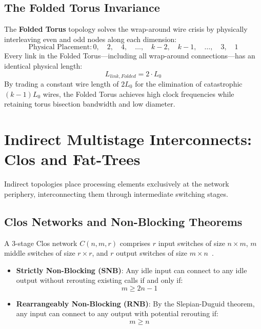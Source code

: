 \subsection{The Folded Torus Invariance}
The \textbf{Folded Torus} topology solves the wrap-around wire crisis by physically interleaving even and odd nodes along each dimension:
\begin{equation}
\text{Physical Placement}: 0, \quad 2, \quad 4, \quad \dots, \quad k-2, \quad k-1, \quad \dots, \quad 3, \quad 1
\label{eq:ch4_folded_order}
\end{equation}
Every link in the Folded Torus—including all wrap-around connections—has an identical physical length:
\begin{equation}
L_{link, Folded} = 2 \cdot L_0
\label{eq:ch4_folded_len}
\end{equation}
By trading a constant wire length of $2 L_0$ for the elimination of catastrophic $(k-1) L_0$ wires, the Folded Torus achieves high clock frequencies while retaining torus bisection bandwidth and low diameter.

\section{Indirect Multistage Interconnects: Clos and Fat-Trees}
\label{sec:ch4_indirect}

Indirect topologies place processing elements exclusively at the network periphery, interconnecting them through intermediate switching stages.

\subsection{Clos Networks and Non-Blocking Theorems}
A 3-stage Clos network $C(n, m, r)$ comprises $r$ input switches of size $n \times m$, $m$ middle switches of size $r \times r$, and $r$ output switches of size $m \times n$~\cite{Clos1953}.
\begin{itemize}
    \item \textbf{Strictly Non-Blocking (SNB)}: Any idle input can connect to any idle output without rerouting existing calls if and only if:
    \begin{equation}
    m \ge 2n - 1
    \label{eq:ch4_clos_snb}
    \end{equation}
    \item \textbf{Rearrangeably Non-Blocking (RNB)}: By the Slepian-Duguid theorem, any input can connect to any output with potential rerouting if:
    \begin{equation}
    m \ge n
    \label{eq:ch4_clos_rnb}
    \end{equation}
\end{itemize}

